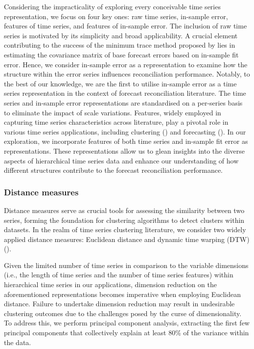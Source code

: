 \documentclass[a4paper,review,12pt,authoryear]{elsarticle}
\begin{document}
Considering the impracticality of exploring every conceivable time series representation, we focus on four key ones: raw time series, in-sample error, features of time series, and features of in-sample error.
The inclusion of raw time series is motivated by its simplicity and broad applicability.
A crucial element contributing to the success of the minimum trace method proposed by \cite{wickramasuriyaOptimalForecastReconciliation2019} lies in estimating the covariance matrix of base forecast errors based on in-sample fit error. Hence, we consider in-sample error as a representation to examine how the structure within the error series influences reconciliation performance. Notably, to the best of our knowledge, we are the first to utilise in-sample error as a time series representation in the context of forecast reconciliation literature.
The time series and in-sample error representations are standardised on a per-series basis to eliminate the impact of scale variations.
Features, widely employed in capturing time series characteristics across literature, play a pivotal role in various time series applications, including clustering (\citealp{tianoFeatTSFeaturebasedTime2021}) and forecasting (\citealp{wangUncertaintyEstimationFeaturebased2022, liFeaturebasedIntermittentDemand2023}). In our exploration, we incorporate features of both time series and in-sample fit error as representations. These representations allow us to glean insights into the diverse aspects of hierarchical time series data and enhance our understanding of how different structures contribute to the forecast reconciliation performance.


 


\subsubsection*{Distance measures}

Distance measures serve as crucial tools for assessing the similarity between two series, forming the foundation for clustering algorithms to detect clusters within datasets. In the realm of time series clustering literature, we consider two widely applied distance measures: Euclidean distance and dynamic time warping (DTW) (\citealp{warrenliaoClusteringTimeSeries2005}). 

Given the limited number of time series in comparison to the variable dimensions (i.e., the length of time series and the number of time series features) within hierarchical time series in our applications, dimension reduction on the aforementioned representations becomes imperative when employing Euclidean distance. Failure to undertake dimension reduction may result in undesirable clustering outcomes due to the challenges posed by the curse of dimensionality. To address this, we perform principal component analysis, extracting the first few principal components that collectively explain at least 80\% of the variance within the data.
\end{document}

